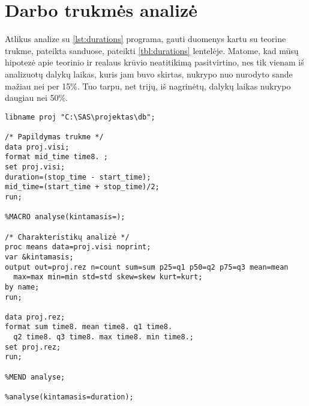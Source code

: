 \section{Darbo trukmės analizė}

Atlikus analize su \ref{lst:durations} programa, gauti duomenys kartu 
su teorine trukme, pateikta sanduose, pateikti \ref{tbl:durations}
lentelėje. Matome, kad mūsų hipotezė apie teorinio ir realaus
krūvio neatitikimą pasitvirtino, nes tik vienam iš analizuotų
dalykų laikas, kuris jam buvo skirtas, nukrypo nuo nurodyto sande
mažiau nei per 15\%. Tuo tarpu, net trijų, iš nagrinėtų, dalykų
laikas nukrypo daugiau nei 50\%.

\begin{listing}[H]
  \begin{verbatim}
libname proj "C:\SAS\projektas\db";

/* Papildymas trukme */
data proj.visi;
format mid_time time8. ;
set proj.visi;
duration=(stop_time - start_time);
mid_time=(start_time + stop_time)/2;
run;

%MACRO analyse(kintamasis=);

/* Charakteristikų analizė */
proc means data=proj.visi noprint;
var &kintamasis;
output out=proj.rez n=count sum=sum p25=q1 p50=q2 p75=q3 mean=mean
  max=max min=min std=std skew=skew kurt=kurt;
by name;
run;

data proj.rez;
format sum time8. mean time8. q1 time8. 
  q2 time8. q3 time8. max time8. min time8.;
set proj.rez;
run;

%MEND analyse;

%analyse(kintamasis=duration);
  \end{verbatim}
  \caption{SAS programa naudota trukmės suskaičiavimui.}
  \label{lst:durations}
\end{listing}

